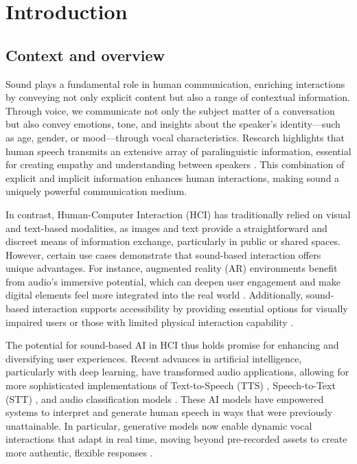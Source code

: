 \section{Introduction}

\subsection{Context and overview}

Sound plays a fundamental role in human communication, enriching interactions by conveying not only explicit content but also a range of contextual information. Through voice, we communicate not only the subject matter of a conversation but also convey emotions, tone, and insights about the speaker’s identity—such as age, gender, or mood—through vocal characteristics. Research highlights that human speech transmits an extensive array of paralinguistic information, essential for creating empathy and understanding between speakers \cite{schuller2013paralinguistics}. This combination of explicit and implicit information enhances human interactions, making sound a uniquely powerful communication medium.

In contrast, Human-Computer Interaction (HCI) has traditionally relied on visual and text-based modalities, as images and text provide a straightforward and discreet means of information exchange, particularly in public or shared spaces. However, certain use cases demonstrate that sound-based interaction offers unique advantages. For instance, augmented reality (AR) environments benefit from audio's immersive potential, which can deepen user engagement and make digital elements feel more integrated into the real world \cite{yang2022audio}. Additionally, sound-based interaction supports accessibility by providing essential options for visually impaired users or those with limited physical interaction capability \cite{brock2015interactive}.

The potential for sound-based AI in HCI thus holds promise for enhancing and diversifying user experiences. Recent advances in artificial intelligence, particularly with deep learning, have transformed audio applications, allowing for more sophisticated implementations of Text-to-Speech (TTS) \cite{ren2020fastspeech}, Speech-to-Text (STT) \cite{inaguma2020espnet}, and audio classification models \cite{gemmeke2017audio}. These AI models have empowered systems to interpret and generate human speech in ways that were previously unattainable. In particular, generative models now enable dynamic vocal interactions that adapt in real time, moving beyond pre-recorded assets to create more authentic, flexible responses \cite{brown2020language}.




